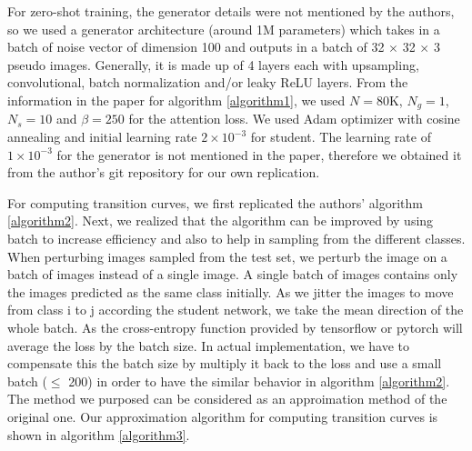 \documentclass{article}
\begin{document}
For zero-shot training, the generator details were not mentioned by the authors, so we used a generator architecture (around 1M parameters) which takes in a batch of noise vector of dimension 100 and outputs in a batch of 32 $\times$ 32 $\times$ 3 pseudo images. Generally, it is made up of 4 layers each with upsampling, convolutional, batch normalization and/or leaky ReLU layers. From the information in the paper for algorithm \ref{algorithm1}, we used $N=80$K, $N_g=1$, $N_s=10$ and $\beta=250$ for the attention loss. We used Adam optimizer with cosine annealing and initial learning rate $2\times10^{-3}$ for student. The learning rate of $1\times10^{-3}$ for the generator is not mentioned in the paper, therefore we obtained it from the author's git repository for our own replication.

For computing transition curves, we first replicated the authors' algorithm \ref{algorithm2}. Next, we realized that the algorithm can be improved by using batch to increase efficiency and also to help in sampling from the different classes. When perturbing images sampled from the test set, we perturb the image on a batch of images instead of a single image. A single batch of images contains only the images predicted as the same class initially. As we jitter the images to move from class i to j according the student network, we take the mean direction of the whole batch. As the cross-entropy function provided by tensorflow or pytorch will average the loss by the batch size. In actual implementation, we have to compensate this the batch size by multiply it back to the loss and use a small batch ($\leq$ 200) in order to have the similar behavior in algorithm \ref{algorithm2}. The method we purposed can be considered as an approimation method of the original one. Our approximation algorithm for computing transition curves is shown in algorithm \ref{algorithm3}.
\end{document}

